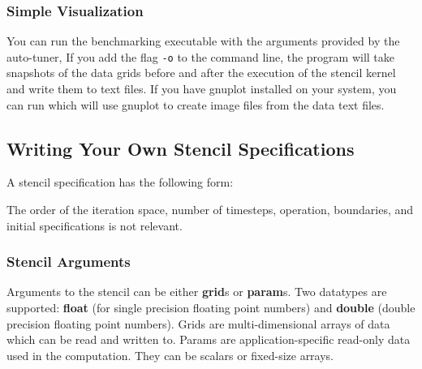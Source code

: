 \subsubsection{Simple Visualization}

You can run the benchmarking executable with the arguments provided by the auto-tuner,
If you add the flag \texttt{-o} to the command line,
the program will take snapshots of the data grids before and after the execution of the stencil kernel
and write them to text files. If you have gnuplot installed on your system, you can run
 which will use gnuplot to create image files from the data text files.


\subsection{Writing Your Own Stencil Specifications}
\label{sec:stencilspec}

A stencil specification has the following form:

The order of the iteration space, number of timesteps, operation, boundaries, and initial specifications
is not relevant.


\subsubsection{Stencil Arguments}

Arguments to the stencil can be either \textbf{grid}s or \textbf{param}s. Two datatypes are supported:
\textbf{float} (for single precision floating point numbers) and \textbf{double} (double precision
floating point numbers). Grids are multi-dimensional arrays of data which can be read and written to.
Params are application-specific read-only data used in the computation. They can be scalars or fixed-size
arrays.

